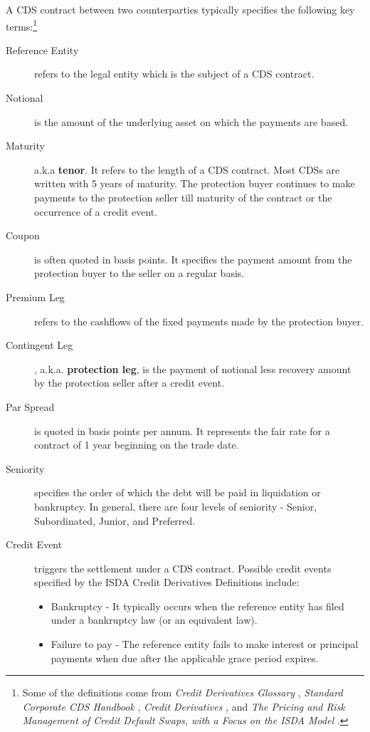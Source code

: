 \documentclass[a4paper]{article}
\begin{document}
A CDS contract between two counterparties typically specifies the
following key terms:\footnote{Some of the definitions come from
  \textit{Credit Derivatives Glossary} \citep{glossary},
  \textit{Standard Corporate CDS Handbook} \citep{barclays},
  \textit{Credit Derivatives} \citep{bloomberg}, and \textit{The
    Pricing and Risk Management of Credit Default Swaps, with a Focus
    on the ISDA Model} \citep{openGamma}.}
\begin{description}
\item[Reference Entity] refers to the legal entity which is the
  subject of a CDS contract. 
\item[Notional] is the amount of the underlying asset on which the
  payments are based.
\item[Maturity] a.k.a \textbf{tenor}. It refers to the length of a CDS
  contract. Most CDSs are written with 5 years of maturity. The
  protection buyer continues to make payments to the protection seller
  till maturity of the contract or the occurrence of a credit event.
\item[Coupon] is often quoted in basis points. It specifies the
  payment amount from the protection buyer to the seller on a regular
  basis.
\item [Premium Leg] refers to the cashflows of the fixed payments made
  by the protection buyer.
\item [Contingent Leg], a.k.a. \textbf{protection leg}, is the payment
  of notional less recovery amount by the protection seller after a
  credit event.
\item[Par Spread] is quoted in basis points per annum. It represents
  the fair rate for a contract of 1 year beginning on the trade date.
\item[Seniority] specifies the order of which the debt will be paid in
  liquidation or bankruptcy. In general, there are four levels of
  seniority - Senior, Subordinated, Junior, and Preferred.
\item[Credit Event] triggers the settlement under a CDS
  contract. Possible credit events specified by the ISDA Credit
  Derivatives Definitions include: 
  \begin{itemize}
  \item Bankruptcy - It typically occurs when the reference entity has
    filed under a bankruptcy law (or an equivalent law).
  \item Failure to pay - The reference entity fails to make interest
    or principal payments when due after the applicable grace period
    expires.

\end{itemize}
\end{description}
\end{document}
